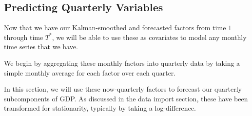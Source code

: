 \documentclass[11pt, letterpaper]{article}\usepackage[]{graphicx}\usepackage[]{color}
\begin{document}
\subsection{Predicting Quarterly Variables}
Now that we have our Kalman-smoothed and forecasted factors from time $1$ through time $T^*$, we will be able to use these as covariates to model any monthly time series that we have.

We begin by aggregating these monthly factors into quarterly data by taking a simple monthly average for each factor over each quarter.

In this section, we will use these now-quarterly factors to forecast our quarterly subcomponents of GDP. As discussed in the data import section, these have been transformed for stationarity, typically by taking a log-difference.
\end{document}

